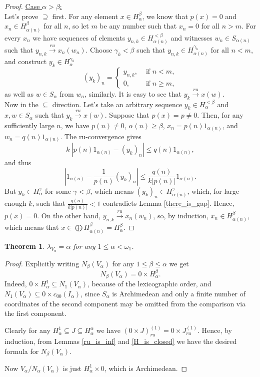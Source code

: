 \documentclass[10pt]{article}
\newtheorem{theorem}{Theorem}[section]
\renewcommand{\a}{\alpha}
\renewcommand{\b}{\beta}
\newcommand{\g}{\gamma}
\newcommand{\w}{\omega}
\begin{document}
\begin{proof}
\medskip\noindent
\underline{Case $ \a > \b $:}\\
Let's prove $ \supseteq $ first.
For any element $ x \in H_\a^\b $, we know that $ p(x) = 0 $ and $ x_n \in H_{\a(n)}^\b $ for all $ n $, so let $ m $ be any number such that $ x_n = 0 $ for all $ n > m $.
For every $ x_n $ we have sequences of elements $ y_{n, k} \in H_{\a(n)}^{<\b} $ and witnesses 
$ w_n \in S_{\a(n)} $ such that $ y_{n, k}  \overset{ru}{\rightarrow} x_n (w_n) $.
Choose $ \g_k < \b $ such that $ y_{n, k} \in H_{\a(n)}^{\g_k} $ for all $ n < m $, and construct $ y_k \in H_\a^{\g_k} $
$$
	(y_k)_n = 
	\begin{cases}
		y_{n, k}, & \text{ if } n < m, \\
		0, & \text{ if } n \geqslant m,
	\end{cases}
$$
as well as $ w \in S_\a $ from $ w_n $, similarly.
It is easy to see that $ y_k  \overset{ru}{\rightarrow} x (w) $.
\\
Now in the $ \subseteq $ direction.
Let's take an arbitrary sequence $ y_k \in H_\a^{<\b} $ and $ x, w \in S_\a $ such that $ y_k  \overset{ru}{\rightarrow} x (w) $.
Suppose that $ p(x) = p \neq 0 $. Then, for any sufficiently large $ n $, we have $ p(n) \neq 0 $, $ \a(n) \geqslant \b $, $ x_n = p(n) 1_{\a(n)} $, 
and $ w_n = q(n) 1_{\a(n)} $. The ru-convergence gives
$$
	k \ |p(n) 1_{\a(n)} - (y_k)_n | \leqslant q(n) 1_{\a(n)},
$$
and thus
$$
	| 1_{\a(n)} - \frac{1}{p(n)}(y_k)_n | \leqslant \frac{q(n)}{k|p(n)|} 1_{\a(n)}.
$$
But $ y_k \in H_{\a}^\g $ for some $ \g < \b $, which means $ (y_k)_n \in H_{\a(n)}^\g $, which, for large enough $ k $, such that $  \frac{q(n)}{k|p(n)|} < 1 $ 
contradicts Lemma \ref{there_is_gap}.
Hence, $ p(x) = 0 $. On the other hand, $ y_{n, k}  \overset{ru}{\rightarrow} x_n (w_n) $, so, by induction, $ x_n \in H_{\a(n)}^\b $, 
which means that $ x \in \bigoplus H_{\a(n)}^\b = H_\a^\b $.
\end{proof}

\begin{theorem}\label{Theorem-4_2}
$\lambda_{V_\a} = \a $ for any $ 1 \leqslant \alpha < \w_1 $.
\end{theorem}

\begin{proof}
Explicitly writing $ N_\b (V_\a) $ for any $ 1 \leqslant \b \leqslant \a $ we get
$$
	N_\b(V_\a) = 0 \times H_\a^\b.
$$
Indeed, $ 0 \times H_\a^1 \subseteq N_1(V_\a) $, 
because of the lexicographic order, and $ N_1(V_\a) \subseteq 0 \times c_{00}(I_\a)$, 
since $ S_\a $ is Archimedean and only a finite number of coordinates of the second component may be omitted from the comparison via the first component.

\medskip
Clearly for any $ H_\a^1 \subseteq J \subseteq H_\a^\a $ we have $ (0 \times J)_{ru}^{(1)} = 0 \times J_{ru}^{(1)} $. Hence, by induction, from Lemmas \ref{ru_is_inf} and \ref{H_is_closed} we have the desired formula for $ N_\b(V_\a) $.

\medskip
Now $ V_\a / N_\a(V_\a) $ is just $ H_\a^1 \times 0 $, which is Archimedean.
\end{proof}
\end{document}
